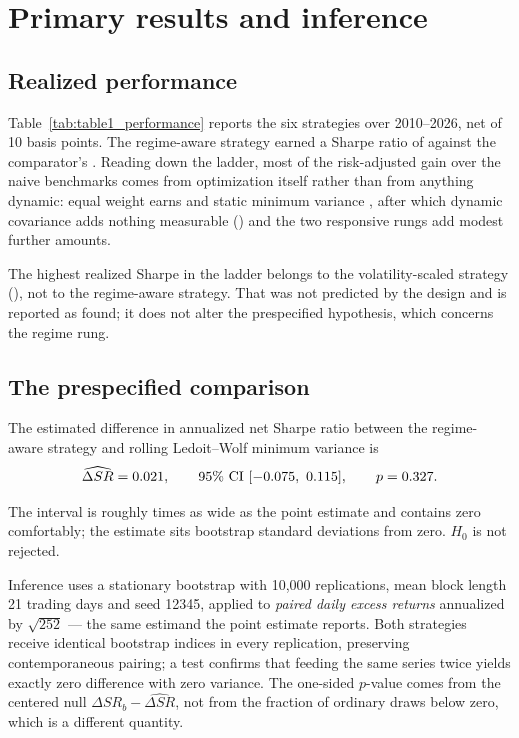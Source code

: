 \section{Primary results and inference}
\label{sec:results}

\subsection{Realized performance}

Table~\ref{tab:table1_performance} reports the six strategies over
2010--2026, net of 10 basis points. The regime-aware strategy earned a
Sharpe ratio of \regimeSharpe{} against the comparator's
\comparatorSharpe{}. Reading down the ladder, most of the risk-adjusted
gain over the naive benchmarks comes from optimization itself rather
than from anything dynamic: equal weight earns \equalWeightSharpe{} and
static minimum variance \staticMinvarSharpe{}, after which dynamic
covariance adds nothing measurable (\comparatorSharpe{}) and the two
responsive rungs add modest further amounts.

The highest realized Sharpe in the ladder belongs to the
volatility-scaled strategy (\ewmaScaledSharpe{}), not to the regime-aware strategy.
That was not predicted by the design and is reported as found; it does
not alter the prespecified hypothesis, which concerns the regime rung.



\subsection{The prespecified comparison}

The estimated difference in annualized net Sharpe ratio between the
regime-aware strategy and rolling Ledoit--Wolf minimum variance is
\begin{equation}
\widehat{\Delta SR} = 0.021, \qquad
\text{95\% CI } [-0.075,\ 0.115], \qquad
p = 0.327 .
\end{equation}

The interval is roughly \ciWidthMultiple{} times as wide as the point
estimate and contains zero comfortably; the estimate sits
\primarySdsFromZero{} bootstrap standard deviations from zero. $H_0$ is
not rejected.

Inference uses a stationary bootstrap with 10{,}000 replications, mean
block length 21 trading days and seed 12345, applied to \emph{paired
daily excess returns} annualized by $\sqrt{252}$ --- the same estimand
the point estimate reports. Both strategies receive identical bootstrap
indices in every replication, preserving contemporaneous pairing; a test
confirms that feeding the same series twice yields exactly zero
difference with zero variance. The one-sided $p$-value comes from the
centered null $\Delta SR_b - \widehat{\Delta SR}$, not from the fraction
of ordinary draws below zero, which is a different quantity.

